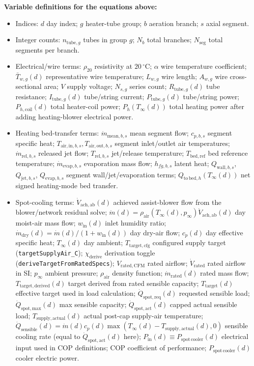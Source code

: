 \documentclass[11pt]{article}
\begin{document}
\textbf{Variable definitions for the equations above:}
\begin{itemize}[leftmargin=*]
\item Indices: \(d\) day index; \(g\) heater-tube group; \(b\) aeration branch; \(s\) axial segment.
\item Integer counts: \(n_{\mathrm{tube},g}\) tubes in group \(g\); \(N_b\) total branches; \(N_{\mathrm{seg}}\) total segments per branch.
\item Electrical/wire terms: \(\rho_{20}\) resistivity at \(20\,^\circ\mathrm{C}\); \(\alpha\) wire temperature coefficient; \(\bar T_{w,g}(d)\) representative wire temperature; \(L_{w,g}\) wire length; \(A_{w,g}\) wire cross-sectional area; \(V\) supply voltage; \(N_{s,g}\) series count; \(R_{\mathrm{tube},g}(d)\) tube resistance; \(I_{\mathrm{tube},g}(d)\) tube/string current; \(P_{\mathrm{tube},g}(d)\) tube/string power; \(P_{h,\mathrm{coil}}(d)\) total heater-coil power; \(P_h(T_\infty(d))\) total heating power after adding heating-blower electrical power.
\item Heating bed-transfer terms: \(\dot m_{\mathrm{mean},b,s}\) mean segment flow; \(c_{p,b,s}\) segment specific heat; \(T_{\mathrm{air,in},b,s},T_{\mathrm{air,out},b,s}\) segment inlet/outlet air temperatures; \(\dot m_{\mathrm{rel},b,s}\) released jet flow; \(T_{\mathrm{rel},b,s}\) jet/release temperature; \(T_{\mathrm{bed,ref}}\) bed reference temperature; \(\dot m_{\mathrm{evap},b,s}\) evaporation mass flow; \(h_{fg,b,s}\) latent heat; \(Q_{\mathrm{wall},b,s}\), \(Q_{\mathrm{jet},b,s}\), \(Q_{\mathrm{evap},b,s}\) segment wall/jet/evaporation terms; \(Q_{\mathrm{to\,bed},h}(T_\infty(d))\) net signed heating-mode bed transfer.
\item Spot-cooling terms: \(\dot V_{\mathrm{ach},\mathrm{ab}}(d)\) achieved assist-blower flow from the blower/network residual solve; \(\dot m(d)=\rho_{\mathrm{air}}(T_\infty(d),p_\infty)\dot V_{\mathrm{ach},\mathrm{ab}}(d)\) day moist-air mass flow; \(w_{\mathrm{in}}(d)\) inlet humidity ratio; \(\dot m_{\mathrm{dry}}(d)=\dot m(d)/(1+w_{\mathrm{in}}(d))\) day dry-air flow; \(c_p(d)\) day effective specific heat; \(T_\infty(d)\) day ambient; \(T_{\mathrm{target,cfg}}\) configured supply target (\texttt{targetSupplyAir\_C}); \(\chi_{\mathrm{derive}}\) derivation toggle (\texttt{deriveTargetFromRatedSpecs}); \(V_{\mathrm{rated,CFM}}\) rated airflow; \(\dot V_{\mathrm{rated}}\) rated airflow in SI; \(p_\infty\) ambient pressure; \(\rho_{\mathrm{air}}\) density function; \(\dot m_{\mathrm{rated}}(d)\) rated mass flow; \(T_{\mathrm{target,derived}}(d)\) target derived from rated sensible capacity; \(T_{\mathrm{target}}(d)\) effective target used in load calculation; \(\dot Q_{\mathrm{spot,req}}(d)\) requested sensible load; \(\dot Q_{\mathrm{spot,max}}(d)\) max sensible capacity; \(\dot Q_{\mathrm{spot,act}}(d)\) capped actual sensible load; \(T_{\mathrm{supply,actual}}(d)\) actual post-cap supply-air temperature; \(\dot Q_{\mathrm{sensible}}(d)=\dot m(d)c_p(d)\max(T_\infty(d)-T_{\mathrm{supply,actual}}(d),0)\) sensible cooling rate (equal to \(\dot Q_{\mathrm{spot,act}}(d)\) here); \(P_{\mathrm{in}}(d)\equiv P_{\mathrm{spot\,cooler}}(d)\) electrical input used in COP definitions; \(\mathrm{COP}\) coefficient of performance; \(P_{\mathrm{spot\,cooler}}(d)\) cooler electric power.

\end{itemize}
\end{document}

